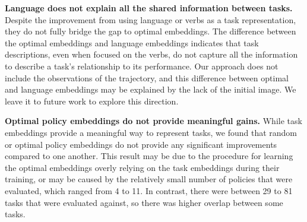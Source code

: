 \textbf{Language does not explain all the shared information between tasks.}
Despite the improvement from using language or verbs as a task representation, they do not fully bridge the gap to optimal embeddings.
The difference between the optimal embeddings and language embeddings indicates that task descriptions, even when focused on the verbs, do not capture all the information to describe a task's relationship to its performance.
Our approach does not include the observations of the trajectory, and this difference between optimal and language embeddings may be explained by the lack of the initial image.
We leave it to future work to explore this direction.

\textbf{Optimal policy embeddings do not provide meaningful gains.}
While task embeddings provide a meaningful way to represent tasks, we found that random or optimal policy embeddings do not provide any significant improvements compared to one another.
This result may be due to the procedure for learning the optimal embeddings overly relying on the task embeddings during their training, or may be caused by the relatively small number of policies that were evaluated, which ranged from 4 to 11. 
In contrast, there were between 29 to 81 tasks that were evaluated against, so there was higher overlap between some tasks.

